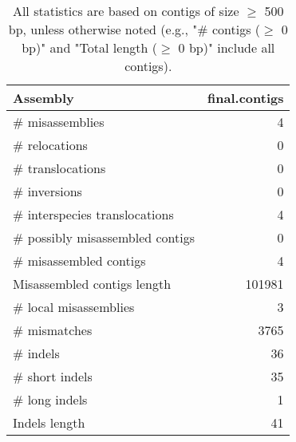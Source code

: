 \documentclass[12pt,a4paper]{article}
\begin{document}
\begin{table}[ht]
\begin{center}
\caption{All statistics are based on contigs of size $\geq$ 500 bp, unless otherwise noted (e.g., "\# contigs ($\geq$ 0 bp)" and "Total length ($\geq$ 0 bp)" include all contigs).}
\begin{tabular}{|l*{1}{|r}|}
\hline
Assembly & final.contigs \\ \hline
\# misassemblies & 4 \\ \hline
\hspace{5mm}\# relocations & 0 \\ \hline
\hspace{5mm}\# translocations & 0 \\ \hline
\hspace{5mm}\# inversions & 0 \\ \hline
\hspace{5mm}\# interspecies translocations & 4 \\ \hline
\# possibly misassembled contigs & 0 \\ \hline
\# misassembled contigs & 4 \\ \hline
Misassembled contigs length & 101981 \\ \hline
\# local misassemblies & 3 \\ \hline
\# mismatches & 3765 \\ \hline
\# indels & 36 \\ \hline
\hspace{5mm}\# short indels & 35 \\ \hline
\hspace{5mm}\# long indels & 1 \\ \hline
Indels length & 41 \\ \hline
\end{tabular}
\end{center}
\end{table}
\end{document}
